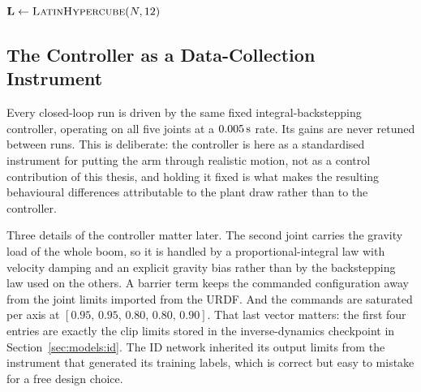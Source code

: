 \begin{algorithm}[tb]
  \small
  \DontPrintSemicolon
  \BlankLine
  $\mathbf{L}\leftarrow\textsc{LatinHypercube}(N,12)$
  \caption{Closed-loop curriculum generation.}
  \label{alg:data:closed-loop}
\end{algorithm}

\subsection{The Controller as a Data-Collection Instrument}

Every closed-loop run is driven by the same fixed integral-backstepping
controller, operating on all five joints at a $\unit[0.005]{s}$ rate.
Its gains are never retuned between runs. This is deliberate: the
controller is here as a standardised instrument for putting the arm
through realistic motion, not as a control contribution of this thesis,
and holding it fixed is what makes the resulting behavioural differences
attributable to the plant draw rather than to the controller.

Three details of the controller matter later. The second joint carries
the gravity load of the whole boom, so it is handled by a
proportional-integral law with velocity damping and an explicit gravity
bias rather than by the backstepping law used on the others. A barrier
term keeps the commanded configuration away from the joint limits
imported from the URDF. And the commands are saturated per axis at
$[0.95,\, 0.95,\, 0.80,\, 0.80,\, 0.90]$. That last vector matters: the first four entries are exactly the clip limits stored in the
inverse-dynamics checkpoint in Section~\ref{sec:models:id}. The ID
network inherited its output limits from the instrument that generated
its training labels, which is correct but easy to mistake for a
free design choice.

